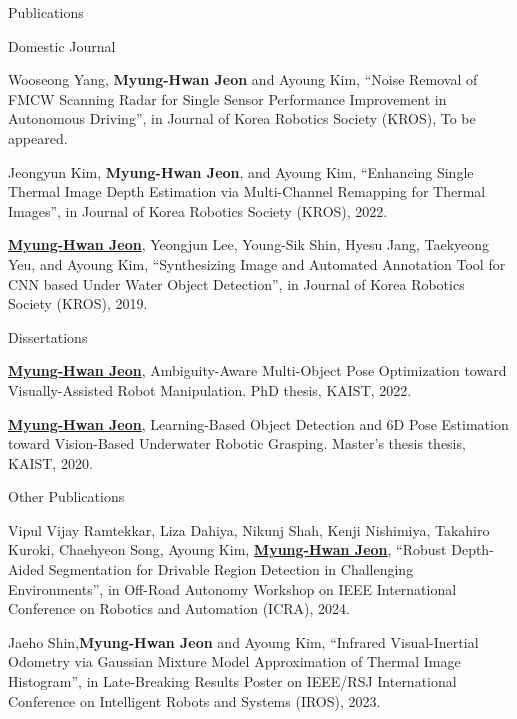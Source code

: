 \begin{rSection}{Publications}
\begin{pubSubsection}{Domestic Journal}
  \item Wooseong Yang, \textbf{Myung-Hwan Jeon} and Ayoung Kim, “Noise Removal of FMCW Scanning Radar for Single Sensor Performance Improvement in Autonomous Driving”, in Journal of Korea Robotics Society (KROS), To be appeared.

  \item Jeongyun Kim, \textbf{Myung-Hwan Jeon}, and Ayoung Kim, “Enhancing Single Thermal Image Depth Estimation via Multi-Channel Remapping for Thermal Images”, in Journal of Korea Robotics Society (KROS), 2022.
  
  \item \underline{\textbf{Myung-Hwan Jeon}}, Yeongjun Lee, Young-Sik Shin, Hyesu Jang, Taekyeong Yeu, and Ayoung Kim, “Synthesizing Image and Automated Annotation Tool for CNN based Under Water Object Detection”, in Journal of Korea Robotics Society (KROS), 2019.
  
\end{pubSubsection}

\begin{pubSubsection}{Dissertations}
  \item \underline{\textbf{Myung-Hwan Jeon}}, Ambiguity-Aware Multi-Object Pose Optimization toward Visually-Assisted Robot Manipulation. PhD thesis, \acf{KAIST}, 2022.
  
  \item \underline{\textbf{Myung-Hwan Jeon}}, Learning-Based Object Detection and 6D Pose Estimation toward Vision-Based Underwater Robotic Grasping. Master's thesis thesis, \acf{KAIST}, 2020.
  
\end{pubSubsection}

\begin{pubSubsection}{Other Publications}

  \item Vipul Vijay Ramtekkar, Liza Dahiya, Nikunj Shah, Kenji Nishimiya, Takahiro Kuroki, Chaehyeon Song, Ayoung Kim, \underline{\textbf{Myung-Hwan Jeon}}, “Robust Depth-Aided Segmentation for Drivable Region Detection in Challenging Environments”, in Off-Road Autonomy Workshop on IEEE International Conference on Robotics and Automation (ICRA), 2024.    

  \item Jaeho Shin,\textbf{Myung-Hwan Jeon} and Ayoung Kim, “Infrared Visual-Inertial Odometry via Gaussian Mixture Model Approximation of Thermal Image Histogram”, in Late-Breaking Results Poster on IEEE/RSJ International Conference on Intelligent Robots and Systems (IROS), 2023.  
  

\end{pubSubsection}
\end{rSection}
